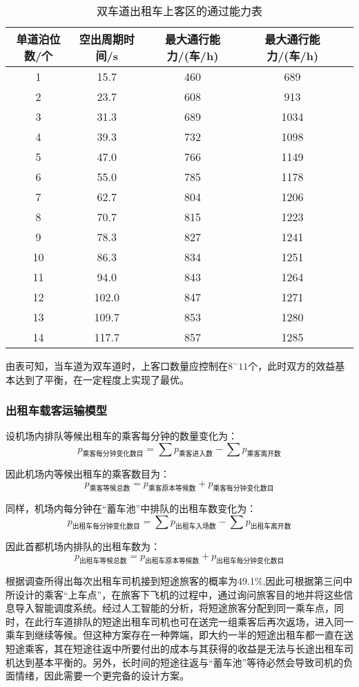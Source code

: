 \documentclass[withoutpreface,bwprint]{cumcmthesis} %
\begin{document}
\begin{table}[!htbp]
	\caption{双车道出租车上客区的通过能力表}\label{tab:008} \centering
	\begin{tabular}{ccccc}
		\toprule[2pt]
		单道泊位数/个 & 空出周期时间/s & 最大通行能力/(车/h) & 最大通行能力/(车/h)\\
		\midrule[1pt]
		1 & 15.7 & 460 & 689\\
    	2 & 23.7 & 608 & 913\\ 
	    3 & 31.3 & 689 & 1034\\
	    4 & 39.3 & 732 & 1098\\
	    5 & 47.0 & 766 & 1149\\
	    6 & 55.0 & 785 & 1178\\
	    7 & 62.7 & 804 & 1206\\
	    8 & 70.7 & 815 & 1223\\
	    9 & 78.3 & 827 & 1241\\
	    10 & 86.3 & 834 & 1251\\
	    11 & 94.0 & 843 & 1264\\
    	12 & 102.0 & 847 & 1271\\
	    13 & 109.7 & 853 & 1280\\
	    14 & 117.7 & 857 & 1285\\
		\bottomrule[1.5pt]
	\end{tabular}
\end{table}
\newpage
由表可知，当车道为双车道时，上客口数量应控制在$8^{\sim} 11$个，此时双方的效益基本达到了平衡，在一定程度上实现了最优。


\subsubsection{出租车载客运输模型}
设机场内排队等候出租车的乘客每分钟的数量变化为：
$$
p_{\text{乘客每分钟变化数目}}=\sum p_{\text{乘客进入数}}-\sum p_{\text{乘客离开数}}
$$

因此机场内等候出租车的乘客数目为：
$$
p_{\text{乘客等候总数}}=p_{\text{乘客原本等候数}}+p_{\text{乘客每分钟变化数目}}
$$


同样，机场内每分钟在“蓄车池”中排队的出租车数变化为：
$$
p_{\text{出租车每分钟变化数目}}=\sum p_{\text{出租车入场数}}-\sum p_{\text{出租车离开数}}
$$

因此首都机场内排队的出租车数为：
$$
p_{\text{出租车等候总数}}=p_{\text{出租车原本等候数}}+p_{\text{出租车每分钟变化数目}}
$$

根据调查所得出每次出租车司机接到短途旅客的概率为49.1$\%$,因此可根据第三问中所设计的乘客“上车点”，在旅客下飞机的过程中，通过询问旅客目的地并将这些信息导入智能调度系统。经过人工智能的分析，将短途旅客分配到同一乘车点，同时，在此行车道排队的短途出租车司机也可在送完一组乘客后再次返场，进入同一乘车到继续等候。但这种方案存在一种弊端，即大约一半的短途出租车都一直在送短途乘客，其在短途往返中所要付出的成本与其获得的收益是无法与长途出租车司机达到基本平衡的。另外，长时间的短途往返与“蓄车池”等待必然会导致司机的负面情绪，因此需要一个更完备的设计方案。
\end{document}
